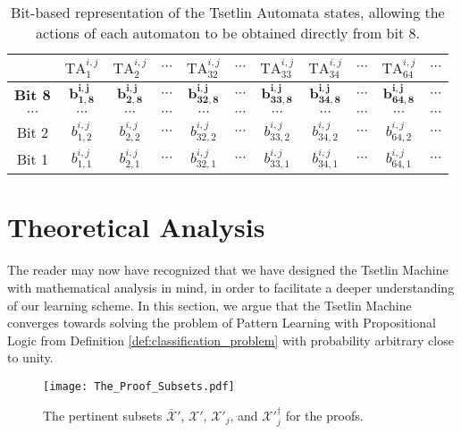 \documentclass[11pt,a4paper]{article}
\begin{document}
\begin{table}[ht]
    \centering
    \begin{tabular}{c|c|c|c|c||c||c|c|c|c||c}
    &$\mathrm{TA}^{i,j}_1$&$\mathrm{TA}^{i,j}_2$&$\cdots$&$\mathrm{TA}^{i,j}_{32}$&$\cdots$&$\mathrm{TA}^{i,j}_{33}$&$\mathrm{TA}^{i,j}_{34}$&$\cdots$&$\mathrm{TA}^{i,j}_{64}$&$\cdots$\\
    \hline
   \textbf{Bit 8}&$\mathbf{b^{i,j}_{1,8}}$&$\mathbf{b^{i,j}_{2,8}}$&$\cdots$&$\mathbf{b^{i,j}_{32,8}}$&$\cdots$&$\mathbf{b^{i,j}_{33,8}}$&$\mathbf{b^{i,j}_{34,8}}$&$\cdots$&$\mathbf{b^{i,j}_{64,8}}$&$\cdots$\\
    $\cdots$&$\cdots$&$\cdots$&$\cdots$&$\cdots$&$\cdots$& $\cdots$&$\cdots$&$\cdots$&$\cdots$&$\cdots$\\
    Bit 2&$b^{i,j}_{1,2}$&$b^{i,j}_{2,2}$&$\cdots$&$b^{i,j}_{32,2}$&$\cdots$&$b^{i,j}_{33,2}$&$b^{i,j}_{34,2}$&$\cdots$&$b^{i,j}_{64,2}$&$\cdots$\\
    Bit 1&$b^{i,j}_{1,1}$&$b^{i,j}_{2,1}$&$\cdots$&$b^{i,j}_{32,1}$&$\cdots$&$b^{i,j}_{33,1}$&$b^{i,j}_{34,1}$&$\cdots$&$b^{i,j}_{64,1}$&$\cdots$\\
    \end{tabular}
    \caption{Bit-based representation of the Tsetlin Automata states, allowing the actions of each automaton to be obtained directly from bit 8.}
    \label{tab:bit_representation}
\end{table}

\section{Theoretical Analysis}
\label{sec:theoretical_results}

The reader may now have recognized that we have designed the Tsetlin Machine with mathematical analysis in mind, in order to facilitate a deeper understanding of our learning scheme. In this section, we argue that the Tsetlin Machine converges towards solving the problem of Pattern Learning with Propositional Logic from Definition \ref{def:classification_problem} with probability arbitrary close to unity.

\begin{figure}[!th]
\centering
\texttt{[image: The\_Proof\_Subsets.pdf]}
\caption{The pertinent subsets $\overline{\mathcal{X}}'$, $\mathcal{X}'$, $\mathcal{X}'_j$, and $\mathcal{X}'^\dagger_j$ for the proofs.}
\label{figure:pertinent_subsets}
\end{figure}
\end{document}
